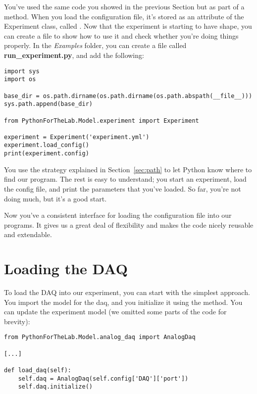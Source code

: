 You've used the same code you showed in the previous Section but as part of a method. When you load the configuration file, it's stored as an attribute of the Experiment class, called . Now that the experiment is starting to have shape, you can create a file to show how to use it and check whether you're doing things properly. In the \emph{Examples} folder, you can create a file called \textbf{run\_experiment.py}, and add the following:

\begin{verbatim}
import sys
import os

base_dir = os.path.dirname(os.path.dirname(os.path.abspath(__file__)))
sys.path.append(base_dir)

from PythonForTheLab.Model.experiment import Experiment

experiment = Experiment('experiment.yml')
experiment.load_config()
print(experiment.config)
\end{verbatim}

You use the strategy explained in Section~\ref{sec:path} to let Python know where to find our program. The rest is easy to understand; you start an experiment, load the config file, and print the parameters that you've loaded. So far, you're not doing much, but it's a good start.

Now you've a consistent interface for loading the configuration file into our programs. It gives us a great deal of flexibility and makes the code nicely reusable and extendable.


\section{Loading the DAQ}\label{sec:loading-daq}
To load the DAQ into our experiment, you can start with the simplest approach. You import the model for the daq, and you initialize it using the  method. You can update the experiment model (we omitted some parts of the code for brevity):

\begin{verbatim}
from PythonForTheLab.Model.analog_daq import AnalogDaq

[...]

def load_daq(self):
    self.daq = AnalogDaq(self.config['DAQ']['port'])
    self.daq.initialize()
\end{verbatim}


